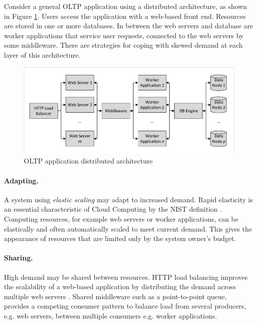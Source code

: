 \documentclass[runningheads]{llncs}
\begin{document}
Consider a general OLTP application using a distributed architecture, as shown in Figure \ref{figure:oltpapplication}.  Users access the application with a web-based front end.  Resources are stored in one or more databases.  In between the web servers and database are worker applications that service user requests, connected to the web servers by some middleware.  There are strategies for coping with skewed demand at each layer of this architecture.

\begin{figure}
	\label{figure:oltpapplication}
	\centering
	\includegraphics[trim = 5 5 5 5, clip, width=\textwidth]{img/application}
	\caption{OLTP application distributed architecture}
\end{figure}

\paragraph{Adapting.} A system using {\itshape elastic scaling} may adapt to increased demand. Rapid elasticity is an essential characteristic of Cloud Computing by the NIST definition \cite{RN56}.  Computing resources, for example web servers or worker applications, can be elastically and often automatically scaled to meet current demand.  This gives the appearance of resources that are limited only by the system owner's budget.

\paragraph{Sharing.} High demand may be shared between resources.  HTTP load balancing improves the scalability of a web-based application by distributing the demand across multiple web servers \cite{RN73}.  Shared middleware such as a point-to-point queue, provides a competing consumer pattern to balance load from several producers, e.g. web servers, between multiple consumers e.g. worker applications.
\end{document}
